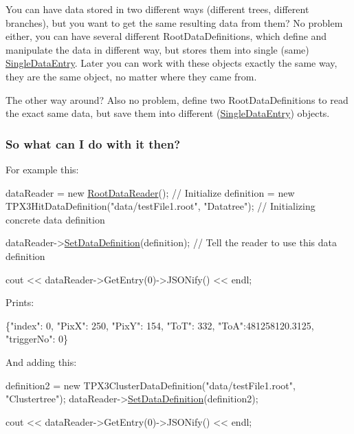\begin{DoxyItemize}
You can have data stored in two different ways (different trees, different branches), but you want to get the same resulting data from them? No problem either, you can have several different Root\+Data\+Definitions, which define and manipulate the data in different way, but stores them into single (same) \hyperlink{classSingleDataEntry}{Single\+Data\+Entry}. Later you can work with these objects exactly the same way, they are the same object, no matter where they came from.

The other way around? Also no problem, define two Root\+Data\+Definitions to read the exact same data, but save them into different (\hyperlink{classSingleDataEntry}{Single\+Data\+Entry}) objects.
\end{DoxyItemize}

\subsubsection*{So what can I do with it then?}

For example this\+:


\begin{DoxyCode}
dataReader = \textcolor{keyword}{new} \hyperlink{classRootDataReader}{RootDataReader}();      \textcolor{comment}{// Initialize}
definition = \textcolor{keyword}{new} TPX3HitDataDefinition(\textcolor{stringliteral}{"data/testFile1.root"}, \textcolor{stringliteral}{"Datatree"});  \textcolor{comment}{// Initializing concrete data
       definition}

dataReader->\hyperlink{classRootDataReader_ad670745df69f90ea6578d7c29cab716f}{SetDataDefinition}(definition);  \textcolor{comment}{// Tell the reader to use this data definition}

cout << dataReader->GetEntry(0)->JSONify() << endl;
\end{DoxyCode}


Prints\+:


\begin{DoxyCode}
\{\textcolor{stringliteral}{"index"}: 0, \textcolor{stringliteral}{"PixX"}: 250, \textcolor{stringliteral}{"PixY"}: 154, \textcolor{stringliteral}{"ToT"}: 332, \textcolor{stringliteral}{"ToA"}:481258120.3125, \textcolor{stringliteral}{"triggerNo"}: 0\}
\end{DoxyCode}


And adding this\+:


\begin{DoxyCode}
definition2 = \textcolor{keyword}{new} TPX3ClusterDataDefinition(\textcolor{stringliteral}{"data/testFile1.root"}, \textcolor{stringliteral}{"Clustertree"});
dataReader->\hyperlink{classRootDataReader_ad670745df69f90ea6578d7c29cab716f}{SetDataDefinition}(definition2);

cout << dataReader->GetEntry(0)->JSONify() << endl;
\end{DoxyCode}


